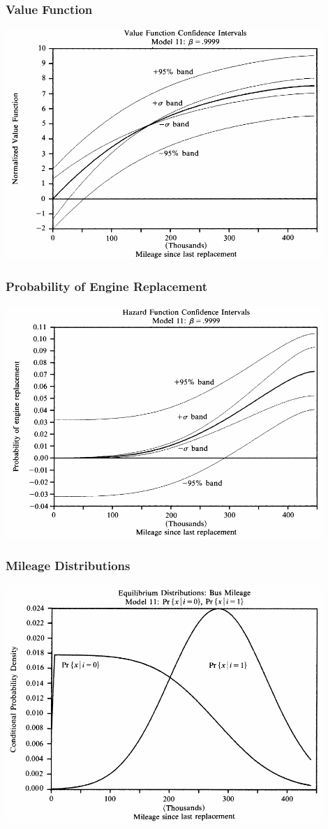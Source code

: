 \documentclass{beamer}
\begin{document}
\begin{frame}\frametitle{Value Function}
	\centering
    \includegraphics[width=0.9\textwidth]{value_function.png}
\end{frame}

\begin{frame}\frametitle{Probability of Engine Replacement}
	\centering
    \includegraphics[width=0.9\textwidth]{hazard_function.png}
\end{frame}

\begin{frame}\frametitle{Mileage Distributions}
    \centering
    \includegraphics[width=0.9\textwidth]{mileage.png}
\end{frame}
\end{document}
